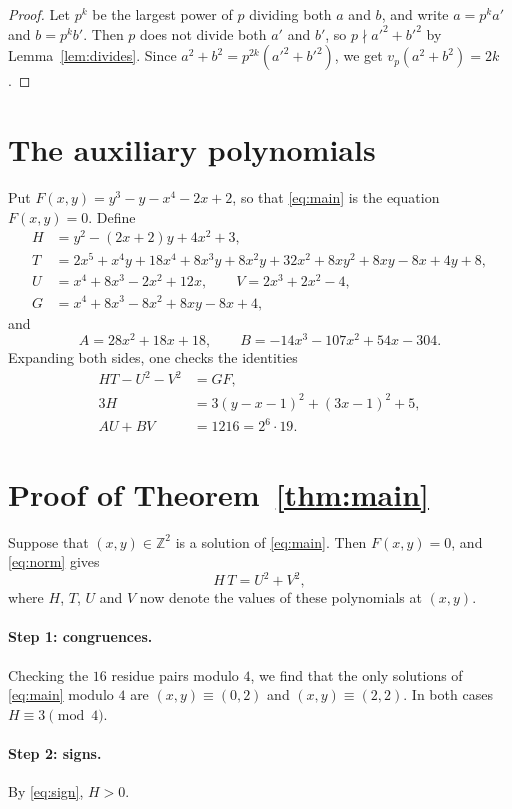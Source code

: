 \documentclass[11pt]{article}
\newcommand{\Z}{\mathbb{Z}}
\begin{document}
\begin{proof}
Let $p^k$ be the largest power of $p$ dividing both $a$ and $b$, and write $a=p^ka'$ and $b=p^kb'$. Then $p$ does not divide both $a'$ and $b'$, so $p\nmid a'^2+b'^2$ by Lemma~\ref{lem:divides}. Since $a^2+b^2=p^{2k}(a'^2+b'^2)$, we get $v_p(a^2+b^2)=2k$.
\end{proof}

\section{The auxiliary polynomials}

Put $F(x,y)=y^3-y-x^4-2x+2$, so that \eqref{eq:main} is the equation $F(x,y)=0$. Define
\begin{align*}
H&=y^2-(2x+2)y+4x^2+3,\\
T&=2x^5+x^4y+18x^4+8x^3y+8x^2y+32x^2+8xy^2+8xy-8x+4y+8,\\
U&=x^4+8x^3-2x^2+12x,\qquad V=2x^3+2x^2-4,\\
G&=x^4+8x^3-8x^2+8xy-8x+4,
\end{align*}
and
\[
A=28x^2+18x+18,\qquad B=-14x^3-107x^2+54x-304.
\]
Expanding both sides, one checks the identities
\begin{align}
HT-U^2-V^2&=GF,\label{eq:norm}\\
3H&=3(y-x-1)^2+(3x-1)^2+5,\label{eq:sign}\\
AU+BV&=1216=2^6\cdot19.\label{eq:bezout}
\end{align}

\section{Proof of Theorem~\ref{thm:main}}

Suppose that $(x,y)\in\Z^2$ is a solution of \eqref{eq:main}. Then $F(x,y)=0$, and \eqref{eq:norm} gives
\begin{equation}\label{eq:HT}
H\,T=U^2+V^2,
\end{equation}
where $H$, $T$, $U$ and $V$ now denote the values of these polynomials at $(x,y)$.

\paragraph{Step 1: congruences.} Checking the $16$ residue pairs modulo $4$, we find that the only solutions of \eqref{eq:main} modulo $4$ are $(x,y)\equiv(0,2)$ and $(x,y)\equiv(2,2)$. In both cases $H\equiv3\pmod4$.

\paragraph{Step 2: signs.} By \eqref{eq:sign}, $H>0$.
\end{document}
